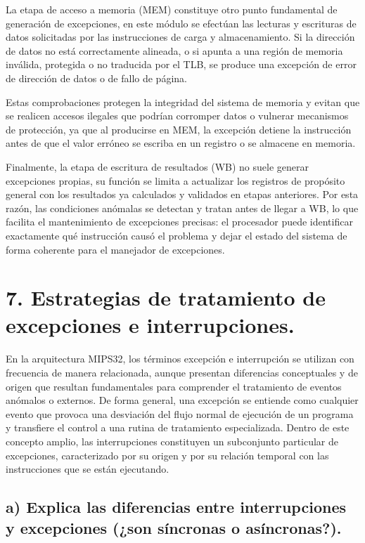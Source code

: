 \documentclass[12pt, letterpaper]{article}
\begin{document}
 La etapa de acceso a memoria (MEM) constituye otro punto fundamental de generación de excepciones, en este módulo se efectúan las lecturas y escrituras de datos solicitadas por las instrucciones de carga y almacenamiento. Si la dirección de datos no está correctamente alineada, o si apunta a una región de memoria inválida, protegida o no traducida por el TLB, se produce una excepción de error de dirección de datos o de fallo de página.

 Estas comprobaciones protegen la integridad del sistema de memoria y evitan que se realicen accesos ilegales que podrían corromper datos o vulnerar mecanismos de protección, ya que al producirse en MEM, la excepción detiene la instrucción antes de que el valor erróneo se escriba en un registro o se almacene en memoria.

 Finalmente, la etapa de escritura de resultados (WB) no suele generar excepciones propias, su función se limita a actualizar los registros de propósito general con los resultados ya calculados y validados en etapas anteriores. Por esta razón, las condiciones anómalas se detectan y tratan antes de llegar a WB, lo que facilita el mantenimiento de excepciones precisas: el procesador puede identificar exactamente qué instrucción causó el problema y dejar el estado del sistema de forma coherente para el manejador de excepciones.\newpage

\section*{\textbf{7. Estrategias de tratamiento de excepciones e interrupciones.}}

En la arquitectura MIPS32, los términos excepción e interrupción se utilizan con frecuencia de manera relacionada, aunque presentan diferencias conceptuales y de origen que resultan fundamentales para comprender el tratamiento de eventos anómalos o externos. De forma general, una excepción se entiende como cualquier evento que provoca una desviación del flujo normal de ejecución de un programa y transfiere el control a una rutina de tratamiento especializada. Dentro de este concepto amplio, las interrupciones constituyen un subconjunto particular de excepciones, caracterizado por su origen y por su relación temporal con las instrucciones que se están ejecutando.

\subsection*{a)	Explica las diferencias entre interrupciones y excepciones (¿son síncronas o asíncronas?).}
\end{document}
